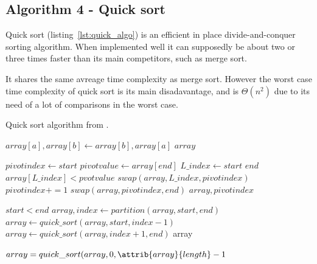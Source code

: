 \documentclass[sigconf, nonacm, natbib, screen, balance=False]{acmart}
\begin{document}
\subsection{Algorithm 4 - Quick sort}\label{sec:algo2}

Quick sort (listing~\ref{lst:quick_algo}) is an efficient in place divide-and-conquer sorting algorithm. When implemented well it can supposedly be about two or three times faster than its main competitors, such as merge sort. 

It shares the same avreage time complexity as merge sort. However the worst case time complexity of quick sort is its main disadavantage, and is $\Theta(n^2)$ due to its need of a lot of comparisons in the worst case.  

\begin{listing}
  \caption{Quick sort algorithm from \citet[Ch.~2.1]{CLRS_2009}.}
  \label{lst:quick_algo}
  
  \begin{codebox}
    \li $array[a], array[b] \gets array[b], array[a]$
    \li \Return $array$
  \end{codebox}

  \begin{codebox}
    \li $pivotindex \gets start$
    \li $pivotvalue \gets array[end]$
    \li \For $L\_index \gets start$ \To $end$ 
    \li \Do
    \If $array[L\_index] < pvotvalue$
    \li \Do
    $swap(array, L\_index, pivotindex)$
    \li $pivotindex += 1$
    \End
    \End
    \li $swap(array, pivotindex, end)$
    \li \Return $array, pivotindex$

  \end{codebox}

  \begin{codebox}
    \li \If $start < end$
    \li \Do
    $array, index \gets partition(array, start, end)$
    \li $array \gets quick\_sort(array, start, index-1)$
    \li $array \gets quick\_sort(array, index+1, end)$
    \li \Return array
  \end{codebox}

  \begin{codebox}
    \li $array = quick\_sort(array, 0, \attrib{array}{length} - 1$

  \end{codebox}

\end{listing}
\end{document}
